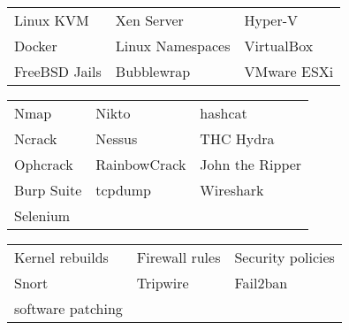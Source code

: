 \documentclass[a4paper,12pt]{memoir} %
\begin{document}

{\begin{tabular}{p{} p{} p{}}
	\bluebullet Linux KVM        & \bluebullet Xen Server        & \bluebullet Hyper-V                \\
	\bluebullet Docker           & \bluebullet Linux Namespaces  & \bluebullet VirtualBox             \\
	\bluebullet FreeBSD Jails    & \bluebullet Bubblewrap        & \bluebullet VMware ESXi            \\
\end{tabular}}


{\begin{tabular}{p{} p{} p{}}
	\bluebullet Nmap             & \bluebullet Nikto             & \bluebullet hashcat                \\
	\bluebullet Ncrack           & \bluebullet Nessus            & \bluebullet THC Hydra              \\
	\bluebullet Ophcrack         & \bluebullet RainbowCrack      & \bluebullet John the Ripper        \\
	\bluebullet Burp Suite       & \bluebullet tcpdump           & \bluebullet Wireshark              \\
	\bluebullet Selenium \\
\end{tabular}}


{\begin{tabular}{p{} p{} p{}}
	\bluebullet Kernel rebuilds   & \bluebullet Firewall rules    & \bluebullet Security policies      \\
	\bluebullet Snort             & \bluebullet Tripwire          & \bluebullet Fail2ban               \\
	\bluebullet software patching \\
\end{tabular}}


\Sep %

\end{document}
